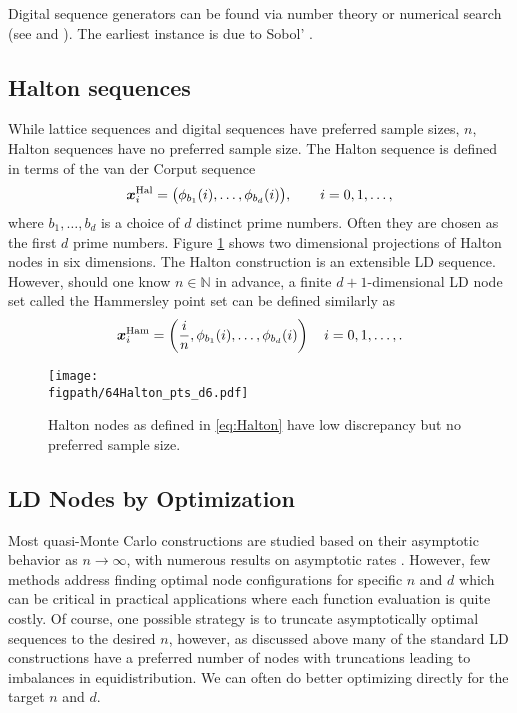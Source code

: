\documentclass{svproc}
\newcommand{\NKNote}[1]{{\textcolor{blue}{Nathan: #1}}}
\newcommand{\figpath}{Figures}
\begin{document}
Digital sequence generators can be found via number theory \cite[Chapter 8]{DicPil10a} or numerical search (see \cite{KuoJoe08a} and \cite[Chapter 10]{DicPil10a}).  The earliest instance is due to Sobol' \cite{Sob67}. %


\subsection{Halton sequences} \label{sec:Halton}  While lattice sequences and digital sequences have preferred sample sizes, $n$, Halton sequences have no preferred sample size.  The Halton sequence is defined in terms of the van der Corput sequence
\begin{equation}\label{eq:Halton}
	{\boldsymbol{x}}^{\text{Hal}}_i = \bigl( \phi_{b_1}(i), \ldots, \phi_{b_d}(i) \bigr), \qquad i = 0, 1, \ldots,
\end{equation}
where $b_1, \ldots, b_d$ is a choice of $d$ distinct prime numbers.  Often they are chosen as the first $d$ prime numbers.  Figure \ref{fig:Halton} shows two dimensional projections of Halton nodes in six dimensions. %
The Halton construction is an extensible LD sequence. However, should one know $n \in \mathbb{N}$ in advance, a finite $d+1$-dimensional LD node set called the Hammersley point set can be defined similarly as
\begin{equation}\label{eq:hammersley}
    {\boldsymbol{x}}_i^{\text{Ham}} = \left( \frac{i}{n}, \phi_{b_1}(i), \ldots, \phi_{b_d}(i) \right) \quad i = 0, 1, \ldots, .
\end{equation}


\begin{figure}
	\centering
	\texttt{[image: \\figpath/64Halton\_pts\_d6.pdf]}
	\caption{Halton nodes as defined in \eqref{eq:Halton} have low discrepancy but no preferred sample size. \label{fig:Halton}}
\end{figure}

\subsection{LD Nodes by Optimization}\label{sec:optLD}

Most quasi-Monte Carlo constructions are studied based on their asymptotic behavior as \(n \to \infty\), with numerous results on asymptotic rates \cite{NIED1978QMCBook,NovWoz10a}. However, few methods address finding optimal node configurations for specific \(n\) and \(d\) which can be critical in practical applications where each function evaluation is quite costly. Of course, one possible strategy is to truncate asymptotically optimal sequences to the desired \(n\), however, as discussed above many of the standard LD constructions have a preferred number of nodes with truncations leading to imbalances in equidistribution. We can often do better optimizing directly for the target \(n\) and \(d\).
\end{document}
